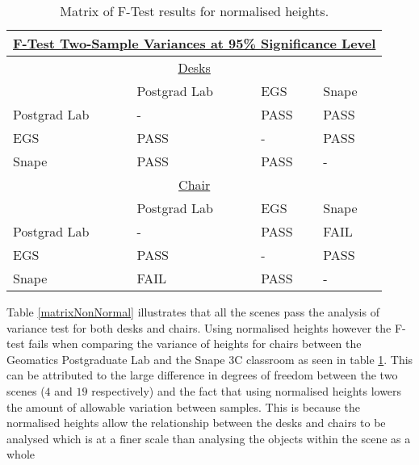 \clearpage
\vspace*{1mm}
\begin{table}[h!]
	\centering
	\begin{tabular}{p{3cm} p{3cm} p{3cm} p{3cm}}
		\hline
		\multicolumn{4}{c}{\textbf{\underline{F-Test Two-Sample Variances at 95\% Significance Level}}} \\
		\hline
		\multicolumn{4}{c}{\underline{Desks}} \\
		\hline
		\multicolumn{1}{l}{\cellcolor{gray!25}} & \multicolumn{1}{l}{\cellcolor{gray!25} Postgrad Lab } & \multicolumn{1}{l}{\cellcolor{gray!25} EGS } & \multicolumn{1}{l}{\cellcolor{gray!25} Snape}\\
		\cellcolor{gray!25} Postgrad Lab & - & \cellcolor{green!50} PASS & \cellcolor{green!50} PASS \\
		\cellcolor{gray!25} EGS & \cellcolor{green!50} PASS & - & \cellcolor{green!50} PASS \\
		\cellcolor{gray!25} Snape & \cellcolor{green!50} PASS & \cellcolor{green!50} PASS & - \\
		\hline
		\multicolumn{4}{c}{\underline{Chair}} \\
		\hline
		\multicolumn{1}{l}{\cellcolor{gray!25}} & \multicolumn{1}{l}{\cellcolor{gray!25} Postgrad Lab } & \multicolumn{1}{l}{\cellcolor{gray!25} EGS } & \multicolumn{1}{l}{\cellcolor{gray!25} Snape}\\
		\cellcolor{gray!25} Postgrad Lab & - & \cellcolor{green!50} PASS & \cellcolor{red!25} FAIL \\
		\cellcolor{gray!25} EGS & \cellcolor{green!50} PASS & - & \cellcolor{green!50} PASS \\
		\cellcolor{gray!25} Snape & \cellcolor{red!25} FAIL & \cellcolor{green!50} PASS & - \\
		\hline
	\end{tabular}
	\caption{Matrix of F-Test results for normalised heights.}
	\label{matrixNormal}
\end{table}
\vspace{1cm}
Table \ref{matrixNonNormal} illustrates that all the scenes pass the analysis of variance test for both desks and chairs. Using normalised heights however the F-test fails when comparing the variance of heights for chairs between the Geomatics Postgraduate Lab and the Snape 3C classroom as seen in table \ref{matrixNormal}. This can be attributed to the large difference in degrees of freedom between the two scenes ($4$ and $19$ respectively) and the fact that using normalised heights lowers the amount of allowable variation between samples. This is because the normalised heights allow the relationship between the desks and chairs to be analysed which is at a finer scale than analysing the objects within the scene as a whole

